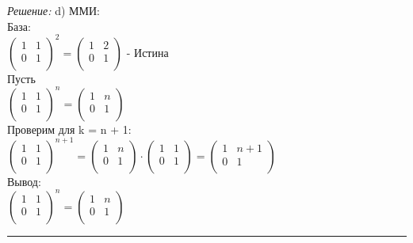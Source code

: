 \documentclass[a4paper, 12pt]{article}
\newenvironment{solution}
    {\textit{Решение: }}
    {\noindent\rule{7in}{1.5pt}}
\begin{document}
\begin{solution}
d)
ММИ: \\
База: \\
$
\left(
\begin{array}{rr}
1 & 1 \\
0 & 1 \\
\end{array}
\right)^2
=
\left(
\begin{array}{rr}
1 & 2 \\
0 & 1 \\
\end{array}
\right)
$ - Истина \\
Пусть \\
$
\left(
\begin{array}{rr}
1 & 1 \\
0 & 1 \\
\end{array}
\right)^n
=
\left(
\begin{array}{rr}
1 & n \\
0 & 1 \\
\end{array}
\right)
$ \\
Проверим для k = n + 1: \\
$
\left(
\begin{array}{rr}
1 & 1 \\
0 & 1 \\
\end{array}
\right)^{n + 1}
=
\left(
\begin{array}{rr}
1 & n \\
0 & 1 \\
\end{array}
\right)
\cdot
\left(
\begin{array}{rr}
1 & 1 \\
0 & 1 \\
\end{array}
\right)
=
\left(
\begin{array}{rr}
1 & n + 1 \\
0 & 1 \\
\end{array}
\right)
$ \\
Вывод: \\
$
\left(
\begin{array}{rr}
1 & 1 \\
0 & 1 \\
\end{array}
\right)^n
=
\left(
\begin{array}{rr}
1 & n \\
0 & 1 \\
\end{array}
\right)
$ \\

\end{solution} 
\end{document}
